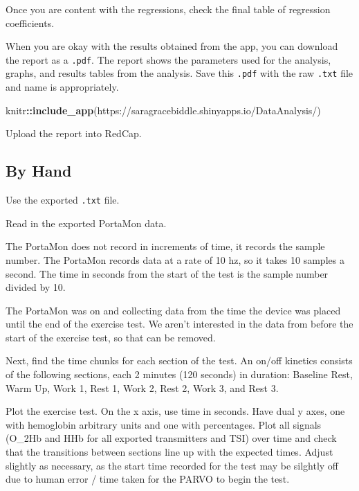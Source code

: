 \documentclass[
]{book}
\newenvironment{Shaded}{\begin{snugshade}}{\end{snugshade}}
\newcommand{\FunctionTok}[1]{\textcolor[rgb]{0.13,0.29,0.53}{\textbf{#1}}}
\newcommand{\NormalTok}[1]{#1}
\newcommand{\SpecialCharTok}[1]{\textcolor[rgb]{0.81,0.36,0.00}{\textbf{#1}}}
\newcommand{\StringTok}[1]{\textcolor[rgb]{0.31,0.60,0.02}{#1}}
\begin{document}
Once you are content with the regressions, check the final table of regression coefficients.

When you are okay with the results obtained from the app, you can download the report as a \texttt{.pdf}. The report shows the parameters used for the analysis, graphs, and results tables from the analysis. Save this \texttt{.pdf} with the raw \texttt{.txt} file and name is appropriately.

\begin{Shaded}
\begin{Highlighting}[]
\NormalTok{knitr}\SpecialCharTok{::}\FunctionTok{include\_app}\NormalTok{(}\StringTok{\textquotesingle{}https://saragracebiddle.shinyapps.io/DataAnalysis/\textquotesingle{}}\NormalTok{)}
\end{Highlighting}
\end{Shaded}

Upload the report into RedCap.

\hypertarget{by-hand}{%
\subsection{By Hand}\label{by-hand}}

Use the exported \texttt{.txt} file.

Read in the exported PortaMon data.

The PortaMon does not record in increments of time, it records the sample number. The PortaMon records data at a rate of 10 hz, so it takes 10 samples a second. The time in seconds from the start of the test is the sample number divided by 10.

The PortaMon was on and collecting data from the time the device was placed until the end of the exercise test. We aren't interested in the data from before the start of the exercise test, so that can be removed.

Next, find the time chunks for each section of the test. An on/off kinetics consists of the following sections, each 2 minutes (120 seconds) in duration: Baseline Rest, Warm Up, Work 1, Rest 1, Work 2, Rest 2, Work 3, and Rest 3.

Plot the exercise test. On the x axis, use time in seconds. Have dual y axes, one with hemoglobin arbitrary units and one with percentages. Plot all signals (O\_2Hb and HHb for all exported transmitters and TSI) over time and check that the transitions between sections line up with the expected times. Adjust slightly as necessary, as the start time recorded for the test may be silghtly off due to human error / time taken for the PARVO to begin the test.
\end{document}
